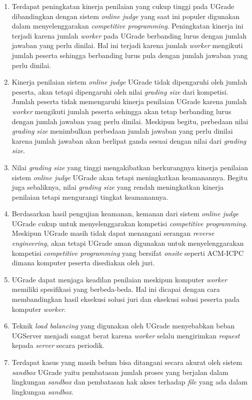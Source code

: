 \begin{enumerate}
    \item Terdapat peningkatan kinerja penilaian yang cukup tinggi pada UGrade dibandingkan dengan sistem \textit{online judge} yang saat ini populer digunakan dalam menyelenggarakan \textit{competitive programming}. Peningkatan kinerja ini terjadi karena jumlah \textit{worker} pada UGrade berbanding lurus dengan jumlah jawaban yang perlu dinilai. Hal ini terjadi karena jumlah \textit{worker} mengikuti jumlah peserta sehingga berbanding lurus pula dengan jumlah jawaban yang perlu dinilai.
    \item Kinerja penilaian sistem \textit{online judge} UGrade tidak dipengaruhi oleh jumlah peserta, akan tetapi dipengaruhi oleh nilai \textit{grading size} dari kompetisi. Jumlah peserta tidak memengaruhi kinerja penilaian UGrade karena jumlah \textit{worker} mengikuti jumlah peserta sehingga akan tetap berbanding lurus dengan jumlah jawaban yang perlu dinilai. Meskipun begitu, perbedaan nilai \textit{grading size} menimbulkan perbedaan jumlah jawaban yang perlu dinilai karena jumlah jawaban akan berlipat ganda sesuai dengan nilai dari \textit{grading size}.
    \item Nilai \textit{grading size} yang tinggi mengakibatkan berkurangnya kinerja penilaian sistem \textit{online judge} UGrade akan tetapi meningkatkan keamanannya. Begitu juga sebaliknya, nilai \textit{grading size} yang rendah meningkatkan kinerja penilaian tetapi mengurangi tingkat keamanannya.
    \item Berdasarkan hasil pengujian keamanan, kemanan dari sistem \textit{online judge} UGrade cukup untuk menyelenggarakan kompetisi \textit{competitive programming}. Meskipun UGrade masih tidak dapat menangani serangan \textit{reverse engineering}, akan tetapi UGrade aman digunakan untuk menyelenggarakan kompetisi \textit{competitive programming} yang bersifat \textit{onsite} seperti ACM-ICPC dimana komputer peserta disediakan oleh juri.
    \item UGrade dapat menjaga keadilan penilaian meskipun komputer \textit{worker} memiliki spesifikasi yang berbeda-beda. Hal ini dicapai dengan cara membandingkan hasil eksekusi solusi juri dan eksekusi solusi peserta pada komputer \textit{worker}.
    \item Teknik \textit{load balancing} yang digunakan oleh UGrade menyebabkan beban UGServer menjadi sangat berat karena \textit{worker} selalu mengirimkan \textit{request} kepada \textit{server} secara periodik.
    \item Terdapat kasus yang masih belum bisa ditangani secara akurat oleh sistem \textit{sandbox} UGrade yaitu pembatasan jumlah proses yang berjalan dalam lingkungan \textit{sandbox} dan pembatasan hak akses terhadap \textit{file} yang ada dalam lingkungan \textit{sandbox}.
\end{enumerate}

